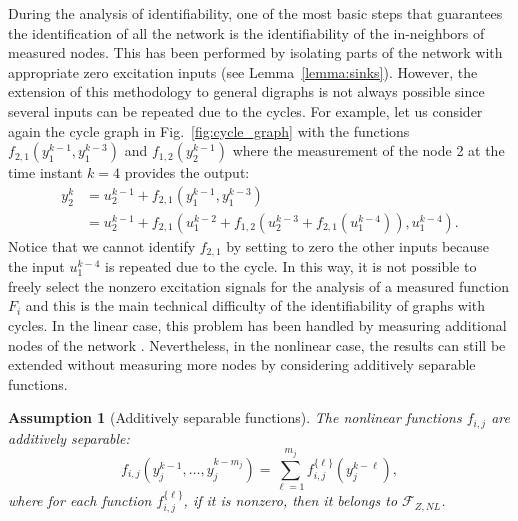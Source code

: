 \documentclass[letterpaper,10pt,journal]{IEEEtran}
\newcommand{\Ftwo}{\mathcal{F}_{Z,NL}}
\newtheorem{assumption}{Assumption}
\begin{document}
During the analysis of identifiability, one of the most basic steps that guarantees the identification of all the network is the identifiability of the in-neighbors of measured nodes. This has been performed by isolating parts of the network with appropriate zero excitation inputs (see Lemma~\ref{lemma:sinks}). However, the extension of this methodology to general digraphs is not always possible since several inputs can be repeated due to the cycles.
For example, let us consider again the cycle graph in Fig.~\ref{fig:cycle_graph} with the functions $f_{2,1}(y_1^{k-1},y_1^{k-3})$ and $f_{1,2}(y_2^{k-1})$  where the measurement of the node 2 at the time instant $k=4$ provides the output:
\begin{align*}
    y_2^k&=u_2^{k-1}+f_{2,1}(y_1^{k-1},y_1^{k-3})\\
    &=u_2^{k-1}+f_{2,1}(u_1^{k-2}+f_{1,2}(u_2^{k-3}+f_{2,1}(u_1^{k-4})),u_1^{k-4}).
\end{align*}
Notice that we cannot identify $f_{2,1}$ by setting to zero the other inputs because the input $u_1^{k-4}$ is repeated due to the cycle. In this way, it is not possible to freely select the nonzero excitation signals for the analysis of a measured function $F_i$ and this is the main technical difficulty of the identifiability of graphs with cycles. In the linear case, this problem has been handled by measuring additional nodes of the network \cite{shi2021single}. Nevertheless, in the nonlinear case, the results can still be extended without measuring more nodes by considering additively separable functions. 


\begin{assumption}[Additively separable functions]\label{ass:separable}
The nonlinear functions $f_{i,j}$ are additively separable:
\begin{equation}\label{eq:separation_analytic}
  f_{i,j}(y_j^{k-1},\ldots,y_j^{k-m_j})=\sum_{\ell=1}^{m_j}
  f_{i,j}^{\{\ell\}}(y_j^{k-\ell}),  
\end{equation} 
where for each function $f_{i,j}^{\{\ell\}}$, if it is nonzero, then it belongs to $\Ftwo$. 
\end{assumption}
\end{document}
